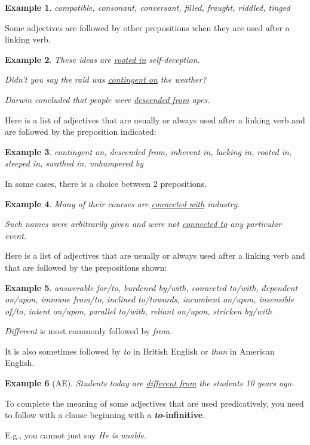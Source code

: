 \documentclass[oneside]{book}
\numberwithin{equation}{section}
\newtheorem{example}{Example}[section]
\begin{document}
\begin{example}
    compatible, consonant, conversant, filled, fraught, riddled, tinged
\end{example}
%
\noindent{} Some adjectives are followed by other prepositions when they are used after a linking verb.
\begin{example}
    These ideas are \underline{rooted in} self-deception.
    
    Didn't you say the raid was \underline{contingent on} the weather?
    
    Darwin concluded that people were \underline{descended from} apes.
\end{example}
Here is a list of adjectives that are usually or always used after a linking verb and are followed by the preposition indicated:
\begin{example}
    contingent on, descended from, inherent in, lacking in, rooted in, steeped in, swathed in, unhampered by
\end{example}
In some cases, there is a choice between 2 prepositions.
\begin{example}
    Many of their courses are \underline{connected with} industry.
    
    Such names were arbitrarily given and were not \underline{connected to} any particular event.
\end{example}
Here is a list of adjectives that are usually or always used after a linking verb and that are followed by the prepositions shown:
\begin{example}
    answerable for/to, burdened by/with, connected to/with, dependent on/upon, immune from/to, inclined to/towards, incumbent on/upon, insensible of/to, intent on/upon, parallel to/with, reliant on/upon, stricken by/with
\end{example}
%
\noindent{} \textit{Different} is most commonly followed by \textit{from}.

It is also sometimes followed by \textit{to} in British English or \textit{than} in American English.
\begin{example}[AE]
    Students today are \underline{different from} the students 10 years ago.
\end{example}
%
\noindent{} To complete the meaning of some adjectives that are used predicatively, you need to follow with a clause beginning with a \textbf{\textit{to}-infinitive}.

E.g., you cannot just say \textit{He is unable}.
\end{document}
